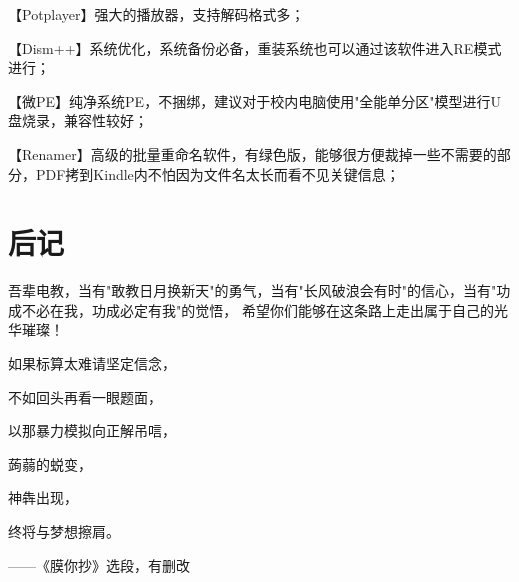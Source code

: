 \documentclass{article}
\begin{document}
        【Potplayer】强大的播放器，支持解码格式多；

        【Dism++】系统优化，系统备份必备，重装系统也可以通过该软件进入RE模式进行；

        【微PE】纯净系统PE，不捆绑，建议对于校内电脑使用"全能单分区"模型进行U盘烧录，兼容性较好；

        【Renamer】高级的批量重命名软件，有绿色版，能够很方便裁掉一些不需要的部分，PDF拷到Kindle内不怕因为文件名太长而看不见关键信息；

    \section{后记}
        吾辈电教，当有"敢教日月换新天"的勇气，当有"长风破浪会有时"的信心，当有"功成不必在我，功成必定有我"的觉悟，
        希望你们能够在这条路上走出属于自己的光华璀璨！

        如果标算太难请坚定信念，

        不如回头再看一眼题面，
        
        以那暴力模拟向正解吊唁，
        
        蒟蒻的蜕变，
        
        神犇出现，
        
        终将与梦想擦肩。

        ——《膜你抄》选段，有删改
\end{document}

